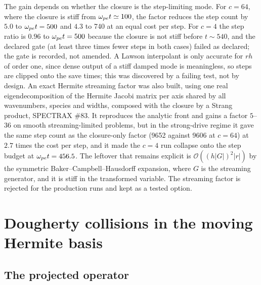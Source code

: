 The gain depends on whether the closure is the step-limiting mode. For $c=64$, where the closure is stiff from $\omega_{pe} t\simeq100$, the factor reduces the step count by $5.0$ to $\omega_{pe} t=500$ and $4.3$ to 740 at an equal cost per step. For $c=4$ the step ratio is $0.96$ to $\omega_{pe} t=500$ because the closure is not stiff before $t\sim540$, and the declared gate (at least three times fewer steps in both cases) failed as declared; the gate is recorded, not amended. A Lawson interpolant is only accurate for $rh$ of order one, since dense output of a stiff damped mode is meaningless, so steps are clipped onto the save times; this was discovered by a failing test, not by design. An exact Hermite streaming factor was also built, using one real eigendecomposition of the Hermite Jacobi matrix per axis shared by all wavenumbers, species and widths, composed with the closure by a Strang product, SPECTRAX \#83. It reproduces the analytic front and gains a factor $5$--$36$ on smooth streaming-limited problems, but in the strong-drive regime it gave the same step count as the closure-only factor (9652 against 9606 at $c=64$) at $2.7$ times the cost per step, and it made the $c=4$ run collapse onto the step budget at $\omega_{pe} t=456.5$. The leftover that remains explicit is $\mathcal O((h|G|)^2|r|)$ by the symmetric Baker--Campbell--Hausdorff expansion, where $G$ is the streaming generator, and it is stiff in the transformed variable. The streaming factor is rejected for the production runs and kept as a tested option.

\section{Dougherty collisions in the moving Hermite basis}\label{sec:collisions}

\subsection{The projected operator}


